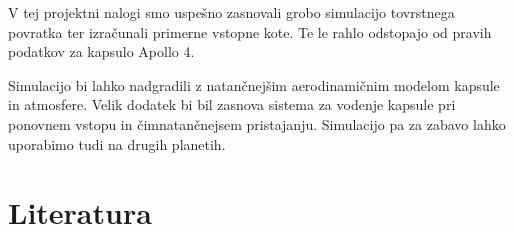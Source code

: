 \documentclass[11pt,a4paper]{article}
\begin{document}
V tej projektni nalogi smo uspe\v sno zasnovali grobo simulacijo tovrstnega povratka ter izra\v cunali primerne vstopne kote. Te le rahlo odstopajo od pravih podatkov za kapsulo Apollo 4.

Simulacijo bi lahko nadgradili z natan\v cnej\v sim aerodinami\v cnim modelom kapsule in atmosfere. Velik dodatek bi bil zasnova sistema za vodenje kapsule pri ponovnem vstopu in \v cimnatan\v cnejsem pristajanju. Simulacijo pa za zabavo lahko uporabimo tudi na drugih planetih.


%

\vspace{2cm}


\clearpage
\section{Literatura}
\printbibliography[heading=none]
\end{document}
